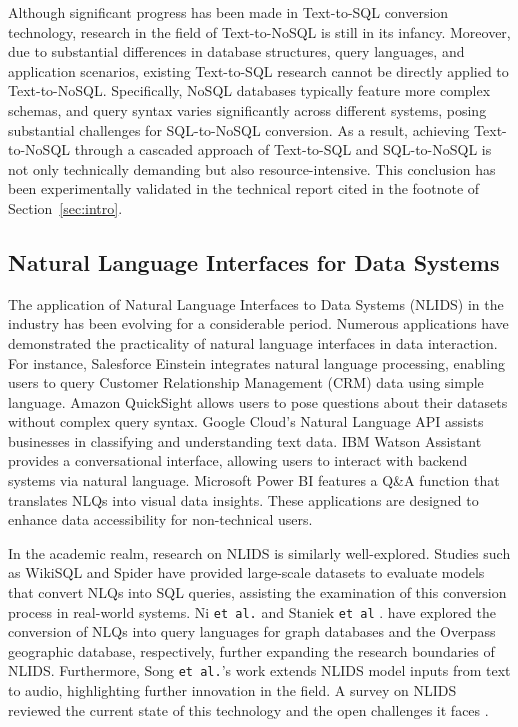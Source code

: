 Although significant progress has been made in Text-to-SQL conversion technology, research in the field of Text-to-NoSQL is still in its infancy. Moreover, due to substantial differences in database structures, query languages, and application scenarios, existing Text-to-SQL research cannot be directly applied to Text-to-NoSQL. Specifically, NoSQL databases typically feature more complex schemas, and query syntax varies significantly across different systems, posing substantial challenges for SQL-to-NoSQL conversion. As a result, achieving Text-to-NoSQL through a cascaded approach of Text-to-SQL and SQL-to-NoSQL is not only technically demanding but also resource-intensive. This conclusion has been experimentally validated in the technical report cited in the footnote of Section~\ref{sec:intro}.

\subsection{Natural Language Interfaces for Data Systems}
The application of Natural Language Interfaces to Data Systems (NLIDS) in the industry has been evolving for a considerable period. Numerous applications have demonstrated the practicality of natural language interfaces in data interaction. For instance, Salesforce Einstein integrates natural language processing, enabling users to query Customer Relationship Management (CRM) data using simple language. Amazon QuickSight allows users to pose questions about their datasets without complex query syntax. Google Cloud's Natural Language API assists businesses in classifying and understanding text data. IBM Watson Assistant provides a conversational interface, allowing users to interact with backend systems via natural language. Microsoft Power BI features a Q\&A function that translates NLQs into visual data insights. These applications are designed to enhance data accessibility for non-technical users.

In the academic realm, research on NLIDS is similarly well-explored. Studies such as WikiSQL \cite{zhong2017seq2sql} and Spider \cite{yu-etal-2018-spider} have provided large-scale datasets to evaluate models that convert NLQs into SQL queries, assisting the examination of this conversion process in real-world systems. Ni \texttt{et al.} \cite{10.1007/s10796-022-10295-0} and Staniek \texttt{et al} \cite{staniek-etal-2024-text}. have explored the conversion of NLQs into query languages for graph databases and the Overpass geographic database, respectively, further expanding the research boundaries of NLIDS. Furthermore, Song \texttt{et al.}'s work \cite{song2024speech,song2022voicequerysystem} extends NLIDS model inputs from text to audio, highlighting further innovation in the field. A survey on NLIDS reviewed the current state of this technology and the open challenges it faces \cite{zcan2020StateOT}.

